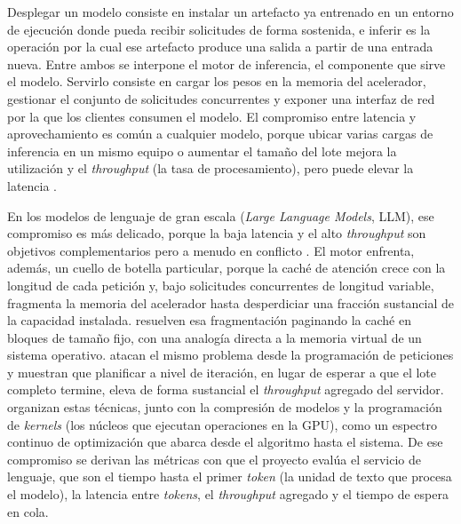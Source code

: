 Desplegar un modelo consiste en instalar un artefacto ya entrenado en un entorno de ejecución donde pueda recibir solicitudes de forma sostenida, e inferir es la operación por la cual ese artefacto produce una salida a partir de una entrada nueva. Entre ambos se interpone el motor de inferencia, el componente que sirve el modelo. Servirlo consiste en cargar los pesos en la memoria del acelerador, gestionar el conjunto de solicitudes concurrentes y exponer una interfaz de red por la que los clientes consumen el modelo. El compromiso entre latencia y aprovechamiento es común a cualquier modelo, porque ubicar varias cargas de inferencia en un mismo equipo o aumentar el tamaño del lote mejora la utilización y el \emph{throughput} (la tasa de procesamiento), pero puede elevar la latencia \citep{ye-dlschedulingsurvey-2024}.

En los modelos de lenguaje de gran escala (\emph{Large Language Models}, LLM), ese compromiso es más delicado, porque la baja latencia y el alto \emph{throughput} son objetivos complementarios pero a menudo en conflicto \citep{miao-llmservingsurvey-2025}. El motor enfrenta, además, un cuello de botella particular, porque la caché de atención crece con la longitud de cada petición y, bajo solicitudes concurrentes de longitud variable, fragmenta la memoria del acelerador hasta desperdiciar una fracción sustancial de la capacidad instalada. \citet{kwon-pagedattention-2023} resuelven esa fragmentación paginando la caché en bloques de tamaño fijo, con una analogía directa a la memoria virtual de un sistema operativo. \citet{yu-orca-2022} atacan el mismo problema desde la programación de peticiones y muestran que planificar a nivel de iteración, en lugar de esperar a que el lote completo termine, eleva de forma sustancial el \emph{throughput} agregado del servidor. \citet{miao-llmservingsurvey-2025} organizan estas técnicas, junto con la compresión de modelos y la programación de \emph{kernels} (los núcleos que ejecutan operaciones en la GPU), como un espectro continuo de optimización que abarca desde el algoritmo hasta el sistema. De ese compromiso se derivan las métricas con que el proyecto evalúa el servicio de lenguaje, que son el tiempo hasta el primer \emph{token} (la unidad de texto que procesa el modelo), la latencia entre \emph{tokens}, el \emph{throughput} agregado y el tiempo de espera en cola.

